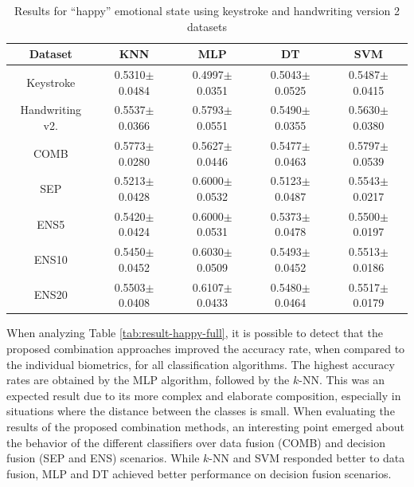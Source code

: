 \documentclass[conference]{IEEEtran}
\begin{document}
\begin{table}
    \centering
    \caption{Results for ``happy'' emotional state  using keystroke and handwriting version 2 datasets}
    \label{tab:result-happy-dynamic}
    \begin{tabular}{|c|c|c|c|c|}
\hline
\textbf{Dataset}          & \textbf{KNN}        & \textbf{MLP}        & \textbf{DT}         & \textbf{SVM}        \\ \hline
Keystroke            & 0.5310$\pm$0.0484 & 0.4997$\pm$0.0351 & 0.5043$\pm$0.0525 & 0.5487$\pm$0.0415 \\ \hline
Handwriting v2. & 0.5537$\pm$0.0366 & 0.5793$\pm$0.0551 & 0.5490$\pm$0.0355 & 0.5630$\pm$0.0380 \\ \hline
COMB               & 0.5773$\pm$0.0280 & 0.5627$\pm$0.0446 & 0.5477$\pm$0.0463 & 0.5797$\pm$0.0539 \\ \hline
SEP              & 0.5213$\pm$0.0428 & 0.6000$\pm$0.0532 & 0.5123$\pm$0.0487 & 0.5543$\pm$0.0217 \\ \hline
ENS5 & 0.5420$\pm$0.0424 & 0.6000$\pm$0.0531 & 0.5373$\pm$0.0478 & 0.5500$\pm$0.0197 \\ \hline
ENS10 & 0.5450$\pm$0.0452 & 0.6030$\pm$0.0509 & 0.5493$\pm$0.0452 & 0.5513$\pm$0.0186 \\ \hline
ENS20 & 0.5503$\pm$0.0408 & 0.6107$\pm$0.0433 & 0.5480$\pm$0.0464 & 0.5517$\pm$0.0179 \\ \hline
\end{tabular}%
\end{table}

When analyzing Table \ref{tab:result-happy-full}, it is possible to detect that the proposed combination approaches improved the accuracy rate, when compared to the individual biometrics, for all classification algorithms. The highest accuracy rates are obtained by the MLP algorithm, followed by the $k$-NN. This was an expected result due to its more complex and elaborate composition, especially in situations where the distance between the classes is small. 
When evaluating the results of the proposed combination methods, an interesting point emerged about the behavior of the different classifiers over data fusion (COMB) and decision fusion (SEP and ENS) scenarios. While $k$-NN and SVM responded better to data fusion, MLP and DT achieved better performance on decision fusion scenarios.
\end{document}
